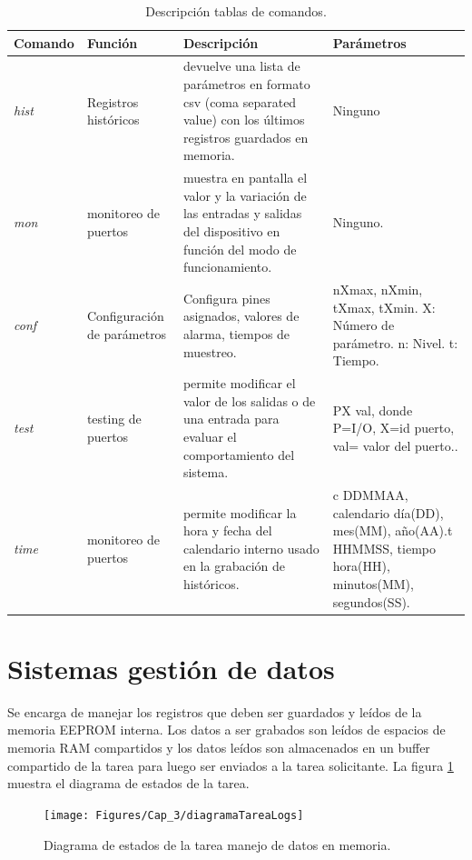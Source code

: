 \begin{table}[h!]
\begin{flushleft}
\begin{tabular}{|m{1.5cm}|m{3cm}|m{4.2cm}|m{4.2cm}|}\hline
{\textbf{Comando}} & {\textbf{Función}} & {\textbf{Descripción}} & {\textbf{Parámetros}} \\ \hline
{\textit{hist}} & {Registros históricos} & { devuelve una lista de parámetros en formato csv (coma separated value) con los últimos registros guardados en memoria.} & {Ninguno} \\ \hline
{\textit{mon}} & {monitoreo de puertos} & {muestra en pantalla el valor y la variación de las entradas y salidas del dispositivo en función del modo de funcionamiento.} & {Ninguno.} \\ \hline
{\textit{conf}} & {Configuración de parámetros} & {Configura pines asignados, valores de alarma, tiempos de muestreo.} & {nXmax, nXmin, tXmax, tXmin. X: Número de parámetro. n: Nivel. t: Tiempo.} \\ \hline
{\textit{test}} & {testing de puertos} & {permite modificar el valor de los salidas o de una entrada para evaluar el comportamiento del sistema.} & {PX val, donde P=I/O, X=id puerto, val= valor del puerto..} \\ \hline
{\textit{time}} & {monitoreo de puertos} & {permite modificar la hora y fecha del calendario interno usado en la grabación de históricos.} & {c DDMMAA, calendario día(DD), mes(MM), año(AA).t HHMMSS, tiempo hora(HH), minutos(MM), segundos(SS).} \\ \hline
\end{tabular}
\end{flushleft}
\caption{Descripción tablas de comandos.}
\label{tablas_comandos}
\end{table}


\section{ Sistemas gestión de datos }

Se encarga de manejar los registros que deben ser guardados y leídos de la memoria EEPROM interna. Los datos a ser grabados son leídos de espacios de memoria RAM compartidos y los datos leídos son almacenados en un buffer compartido de la tarea para luego ser enviados a la tarea solicitante.
La figura \ref{fig:diag_TareasLogs} muestra el diagrama de estados de la tarea.

\begin{figure}[h!]
	\centering
	\texttt{[image: Figures/Cap\_3/diagramaTareaLogs]}
	\caption{Diagrama de estados de la tarea manejo de datos en memoria.}
	\label{fig:diag_TareasLogs}
\end{figure}

